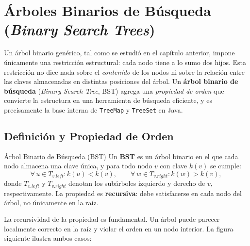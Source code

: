 %

\chapter{Árboles Binarios de Búsqueda (\textit{Binary Search Trees})}
\label{ch:bst}

Un árbol binario genérico, tal como se estudió en el capítulo anterior, impone únicamente
una restricción estructural: cada nodo tiene a lo sumo dos hijos. Esta restricción no dice
nada sobre el \emph{contenido} de los nodos ni sobre la relación entre las claves almacenadas
en distintas posiciones del árbol. Un \textbf{árbol binario de búsqueda} (\textit{Binary
Search Tree}, BST) agrega una \emph{propiedad de orden} que convierte la estructura en una
herramienta de búsqueda eficiente, y es precisamente la base interna de \texttt{TreeMap} y
\texttt{TreeSet} en Java.

\section{Definición y Propiedad de Orden}
\label{sec:bst-definicion}

\begin{definicion}{Árbol Binario de Búsqueda (BST)}
Un \textbf{BST} es un árbol binario en el que cada nodo almacena una clave única, y para
todo nodo $v$ con clave $k(v)$ se cumple:
\[
    \forall\, u \in T_{v.\mathit{left}}  : k(u) < k(v),
    \qquad
    \forall\, w \in T_{v.\mathit{right}} : k(w) > k(v),
\]
donde $T_{v.\mathit{left}}$ y $T_{v.\mathit{right}}$ denotan los subárboles izquierdo y
derecho de $v$, respectivamente. La propiedad es \textbf{recursiva}: debe satisfacerse
en cada nodo del árbol, no únicamente en la raíz.
\end{definicion}

La recursividad de la propiedad es fundamental. Un árbol puede parecer localmente correcto
en la raíz y violar el orden en un nodo interior. La figura siguiente ilustra ambos casos:

